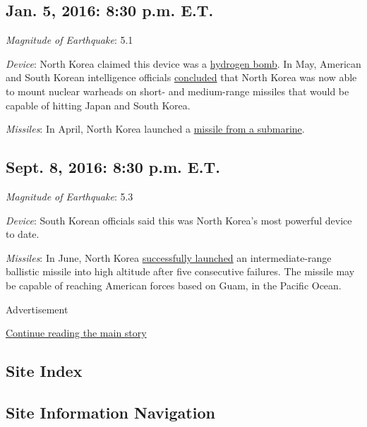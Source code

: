 \hypertarget{jan-5-2016-830-pm-et}{%
\subsection{Jan. 5, 2016: 8:30 p.m. E.T.}\label{jan-5-2016-830-pm-et}}

\emph{Magnitude of Earthquake}: 5.1

\emph{Device}: North Korea claimed this device was a
\href{http://www.nytimes3xbfgragh.onion/2016/01/06/world/asia/north-korea-hydrogen-bomb-test.html}{hydrogen
bomb}. In May, American and South Korean intelligence officials
\href{http://www.nytimes3xbfgragh.onion/2016/05/07/world/asia/north-korea-nuclear-us-strategy.html}{concluded}
that North Korea was now able to mount nuclear warheads on short- and
medium-range missiles that would be capable of hitting Japan and South
Korea.

\emph{Missiles}: In April, North Korea launched a
\href{http://www.nytimes3xbfgragh.onion/2016/08/24/world/asia/north-korea-submarine-missile.html}{missile
from a submarine}.

\hypertarget{sept-8-2016-830-pm-et}{%
\subsection{Sept. 8, 2016: 8:30 p.m. E.T.}\label{sept-8-2016-830-pm-et}}

\emph{Magnitude of Earthquake}: 5.3

\emph{Device}: South Korean officials said this was North Korea's most
powerful device to date.

\emph{Missiles}: In June, North Korea
\href{http://www.nytimes3xbfgragh.onion/2016/06/23/world/asia/north-korea-missile-test.html}{successfully
launched} an intermediate-range ballistic missile into high altitude
after five consecutive failures. The missile may be capable of reaching
American forces based on Guam, in the Pacific Ocean.

Advertisement

\protect\hyperlink{after-bottom}{Continue reading the main story}

\hypertarget{site-index}{%
\subsection{Site Index}\label{site-index}}

\hypertarget{site-information-navigation}{%
\subsection{Site Information
Navigation}\label{site-information-navigation}}

